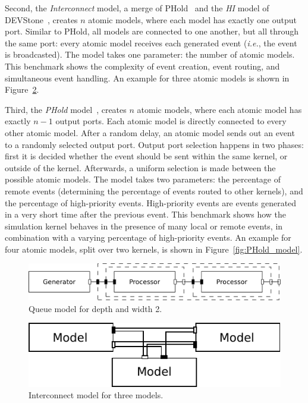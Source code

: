 Second, the \textit{Interconnect} model, a merge of PHold~\cite{PHold} and the \textit{HI} model of DEVStone~\cite{DEVStone}, creates $n$ atomic models, where each model has exactly one output port.
Similar to PHold, all models are connected to one another, but all through the same port: every atomic model receives each generated event (\textit{i.e.}, the event is broadcasted).
The model takes one parameter: the number of atomic models.
This benchmark shows the complexity of event creation, event routing, and simultaneous event handling.
An example for three atomic models is shown in Figure~\ref{fig:interconnect_model}.

Third, the \textit{PHold} model~\cite{PHold}, creates $n$ atomic models, where each atomic model has exactly $n-1$ output ports.
Each atomic model is directly connected to every other atomic model.
After a random delay, an atomic model sends out an event to a randomly selected output port.
Output port selection happens in two phases: first it is decided whether the event should be sent within the same kernel, or outside of the kernel.
Afterwards, a uniform selection is made between the possible atomic models.
The model takes two parameters: the percentage of remote events (determining the percentage of events routed to other kernels), and the percentage of high-priority events.
High-priority events are events generated in a very short time after the previous event.
This benchmark shows how the simulation kernel behaves in the presence of many local or remote events, in combination with a varying percentage of high-priority events.
An example for four atomic models, split over two kernels, is shown in Figure~\ref{fig:PHold_model}.

\begin{figure}
	\center
	\includegraphics[width=\columnwidth]{fig/queue_model_fixed.pdf}
	\caption{Queue model for depth and width 2.}
	\label{fig:queue_model}
\end{figure}
	
\begin{figure}
    \center
	\includegraphics[width=\modelfraction\columnwidth]{fig/interconnect_model.pdf}
	\caption{Interconnect model for three models.}
	\label{fig:interconnect_model}
\end{figure}

